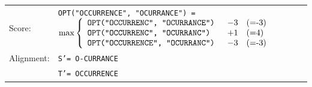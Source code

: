 \documentclass[mathserif]{beamer}
\begin{document}
{\begin{figure}
\begin{tikzpicture}[scale=0.78, auto,swap]
\end{tikzpicture} 
\end{figure}     


  
  \begin{tiny}
 
  \begin{table}
  \begin{tabular}{ll}
  Score:  & \texttt{OPT("OCCURRENCE", "OCURRANCE") = } $  \max \left \{\begin{array}{lll} \text{\tt OPT("OCCURRENC", "OCURRANCE") } & -3  & \text{(=-3) } \\ 
\text{\tt OPT("OCCURRENC", "OCURRANC") }      & +1  & \text{(=4) } \\
\text{\tt OPT("OCCURRENCE", "OCURRANC") }   &  -3 & \text{(=-3) } \end{array} \right.  $       \\
    Alignment:  &  \texttt{S'=  O-CURRANCE } \\ 
   		     &	\texttt{T'=  OCCURRENCE } \\
  \end{tabular} 
  \end{table}
  \end{tiny}  
}

%  

\end{document}
